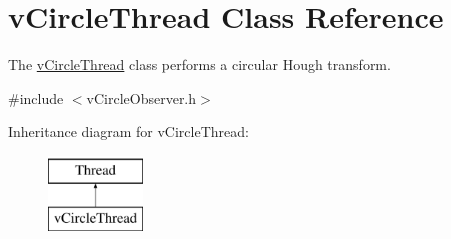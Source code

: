 \hypertarget{classvCircleThread}{\section{v\-Circle\-Thread Class Reference}
\label{classvCircleThread}
}


The \hyperlink{classvCircleThread}{v\-Circle\-Thread} class performs a circular Hough transform.  




{\ttfamily \#include $<$v\-Circle\-Observer.\-h$>$}

Inheritance diagram for v\-Circle\-Thread\-:\begin{figure}[H]
\begin{center}
\leavevmode
\includegraphics[height=2.000000cm]{classvCircleThread}
\end{center}
\end{figure}
